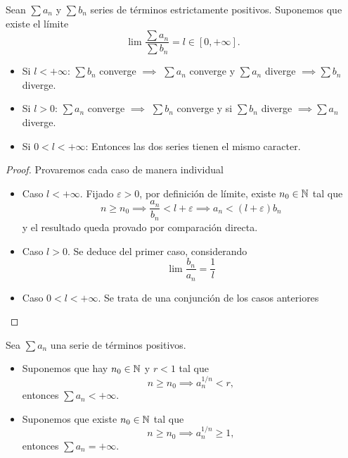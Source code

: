 \begin{prop}
    Sean $\sum a_n$ y $\sum b_n$ series de términos estrictamente positivos.
    Suponemos que existe el límite
    \[
        \lim \frac{\sum a_n}{\sum b_n} = l \in [0,+\infty].
    \]
    \begin{itemize}
        \item Si $l < + \infty$: $\sum b_n$ converge $\implies$ $\sum a_n$ converge y
            $\sum a_n$ diverge $\implies \sum b_n$ diverge.
        \item Si $l > 0$: $\sum a_n$ converge $\implies$ $\sum b_n$ converge y si $\sum b_n$
            diverge $\implies \sum a_n$ diverge.
        \item Si $0 < l < +\infty$: Entonces las dos series tienen el mismo caracter.
    \end{itemize}
\end{prop}
\begin{proof}
    Provaremos cada caso de manera individual
    \begin{itemize}
        \item Caso $l < +\infty$. Fijado $\varepsilon > 0$, por definición de límite, existe
        $n_0\in\mathbb{N}$ tal que
        \[
            n \geq n_0 \implies \frac{a_n}{b_n} < l + \varepsilon \implies
            a_n < (l+\varepsilon)b_n
        \]
        y el resultado queda provado por comparación directa.
        \item Caso $l > 0$. Se deduce del primer caso, considerando
        \[
            \lim \frac{b_n}{a_n} = \frac{1}{l}
        \]
        \item Caso $0 < l < +\infty$. Se trata de una conjunción de los casos
        anteriores
    \end{itemize}
\end{proof}

\begin{lema}
    Sea $\sum a_n$ una serie de términos positivos.
    \begin{itemize}
        \item Suponemos que hay $n_0 \in \mathbb{N}$ y $r < 1$ tal que
        \[
            n \geq n_0 \implies a_n^{1/n} < r,
        \]
        entonces $\sum a_n < +\infty$.
        \item Suponemos que existe $n_0 \in \mathbb{N}$ tal que
        \[
            n \geq n_0 \implies a_n^{1/n} \geq 1,
        \]
        entonces $\sum a_n = +\infty$.
    \end{itemize}
\end{lema}

